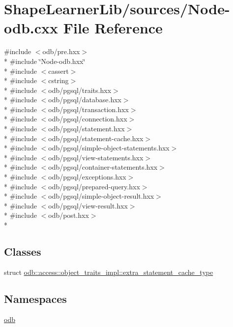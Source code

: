 \hypertarget{_node-odb_8cxx}{}\section{Shape\+Learner\+Lib/sources/\+Node-\/odb.cxx File Reference}
\label{_node-odb_8cxx}
{\ttfamily \#include $<$odb/pre.\+hxx$>$}\\*
{\ttfamily \#include \char`\"{}Node-\/odb.\+hxx\char`\"{}}\\*
{\ttfamily \#include $<$cassert$>$}\\*
{\ttfamily \#include $<$cstring$>$}\\*
{\ttfamily \#include $<$odb/pgsql/traits.\+hxx$>$}\\*
{\ttfamily \#include $<$odb/pgsql/database.\+hxx$>$}\\*
{\ttfamily \#include $<$odb/pgsql/transaction.\+hxx$>$}\\*
{\ttfamily \#include $<$odb/pgsql/connection.\+hxx$>$}\\*
{\ttfamily \#include $<$odb/pgsql/statement.\+hxx$>$}\\*
{\ttfamily \#include $<$odb/pgsql/statement-\/cache.\+hxx$>$}\\*
{\ttfamily \#include $<$odb/pgsql/simple-\/object-\/statements.\+hxx$>$}\\*
{\ttfamily \#include $<$odb/pgsql/view-\/statements.\+hxx$>$}\\*
{\ttfamily \#include $<$odb/pgsql/container-\/statements.\+hxx$>$}\\*
{\ttfamily \#include $<$odb/pgsql/exceptions.\+hxx$>$}\\*
{\ttfamily \#include $<$odb/pgsql/prepared-\/query.\+hxx$>$}\\*
{\ttfamily \#include $<$odb/pgsql/simple-\/object-\/result.\+hxx$>$}\\*
{\ttfamily \#include $<$odb/pgsql/view-\/result.\+hxx$>$}\\*
{\ttfamily \#include $<$odb/post.\+hxx$>$}\\*
\subsection*{Classes}
\begin{DoxyCompactItemize}
\item 
struct \hyperlink{structodb_1_1access_1_1object__traits__impl_1_1extra__statement__cache__type}{odb\+::access\+::object\+\_\+traits\+\_\+impl\+::extra\+\_\+statement\+\_\+cache\+\_\+type}
\end{DoxyCompactItemize}
\subsection*{Namespaces}
\begin{DoxyCompactItemize}
\item 
 \hyperlink{namespaceodb}{odb}
\end{DoxyCompactItemize}
